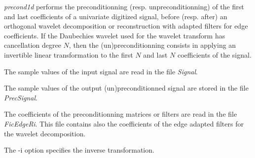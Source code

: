 {\em precond1d} performs the preconditionning (resp. unpreconditionning) 
of the first and last coefficients of a univariate digitized signal, 
before (resp. after) an orthogonal wavelet decomposition or reconstruction 
with adapted filters for edge coefficients. 
If the Daubechies wavelet used for the wavelet transform has cancellation degree $N$, 
then the (un)preconditionning consists in applying an invertible linear transformation 
to the first $N$ and last $N$ coefficients of the signal.

The sample values of the input signal are read in the file {\em Signal}.

The sample values of the output (un)preconditionned signal are stored in the file {\em PrecSignal}.

The coefficients of the preconditionning matrices or filters are read in the file {\em FicEdgeRi}. This file contains also the coefficients of the edge adapted filters for the wavelet decomposition.

The -i option specifies the inverse transformation.

